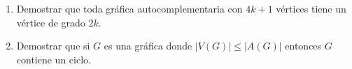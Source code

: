 \documentclass[12pt]{report}
\begin{document}
\begin{enumerate}

%
%
%

\item Demostrar que toda gráfica autocomplementaria con $4k+1$ vértices tiene un vértice de grado $2k$.





\item Demostrar que si $G$ es una gráfica donde $|V(G)| \leq |A(G)|$ entonces $G$ contiene un ciclo.


\end{enumerate}
\end{document}
